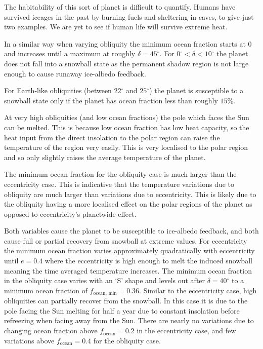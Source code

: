 \documentclass[12pt, onecolumn]{revtex4-2}    %
\newcommand{\degrees}{\ensuremath{^{\circ}}}
\begin{document}
The habitability of this sort of planet is difficult to quantify.
Humans have survived iceages in the past by burning fuels and sheltering in caves, to give just two examples.
We are yet to see if human life will survive extreme heat.

In a similar way when varying obliquity the minimum ocean fraction starts at 0 and increases until a maximum at roughly $\delta = 45\degrees$.
For $0\degrees < \delta < 10\degrees$ the planet does not fall into a snowball state as the permanent shadow region is not large enough to cause runaway ice-albedo feedback.

For Earth-like obliquities (between $22\degrees$ and $25\degrees$) the planet is susceptible to a snowball state only if the planet has ocean fraction less than roughly $15\%$.

At very high obliquities (and low ocean fractions) the pole which faces the Sun can be melted.
This is because low ocean fraction has low heat capacity, so the heat input from the direct insolation to the polar region can raise the temperature of the region very easily.
This is very localised to the polar region and so only slightly raises the average temperature of the planet.

The minimum ocean fraction for the obliquity case is much larger than the eccentricity case.
This is indicative that the temperature variations due to obliquity are much larger than variations due to eccentricity.
This is likely due to the obliquity having a more localised effect on the polar regions of the planet as opposed to eccentricity's planetwide effect.

Both variables cause the planet to be susceptible to ice-albedo feedback, and both cause full or partial recovery from snowball at extreme values.
For eccentricity the minimum ocean fraction varies approximately quadratically with eccentricity until $e = 0.4$ where the eccentricity is high enough to melt the induced snowball meaning the time averaged temperature increases.
The minimum ocean fraction in the obliquity case varies with an `S' shape and levels out after $\delta = 40\degrees$ to a minimum ocean fraction of $f_\text{ocean, min} = 0.36$.
Similar to the eccentricity case, high obliquities can partially recover from the snowball. In this case it is due to the pole facing the Sun melting for half a year due to constant insolation before refreezing when facing away from the Sun.
There are nearly no variations due to changing ocean fraction above $f_\text{ocean} = 0.2$ in the eccentricity case, and few variations above $f_\text{ocean} = 0.4$ for the obliquity case.
\end{document}
